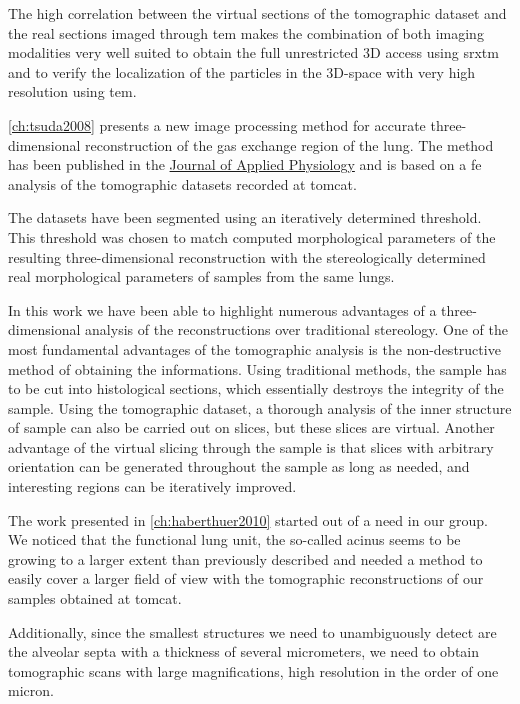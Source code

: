 The high correlation between the virtual sections of the tomographic dataset and the real sections imaged through \ac{tem} makes the combination of both imaging modalities very well suited to obtain the full unrestricted 3D access using \ac{srxtm} and to verify the localization of the particles in the 3D-space with very high resolution using \ac{tem}.

\autoref{ch:tsuda2008} presents a new image processing method for accurate three-dimensional reconstruction of the gas exchange region of the lung. The method has been published in the \href{http://jap.physiology.org/}{Journal of Applied Physiology} and is based on a \ac{fe} analysis of the tomographic datasets recorded at \ac{tomcat}. 

The datasets have been segmented using an iteratively determined threshold. This threshold was chosen to match computed morphological parameters of the resulting three-dimensional reconstruction with the stereologically determined real morphological parameters of samples from the same lungs.

In this work we have been able to highlight numerous advantages of a three-dimensional analysis of the reconstructions over traditional stereology. One of the most fundamental advantages of the tomographic analysis is the non-destructive method of obtaining the informations. Using traditional methods, the sample has to be cut into histological sections, which essentially destroys the integrity of the sample. Using the tomographic dataset, a thorough analysis of the inner structure of sample can also be carried out on slices, but these slices are virtual. Another advantage of the virtual slicing through the sample is that slices with arbitrary orientation can be generated throughout the sample as long as needed, and interesting regions can be iteratively improved.

The work presented in \autoref{ch:haberthuer2010} started out of a need in our group. We noticed that the functional lung unit, the so-called acinus seems to be growing to a larger extent than previously described \cite{Massaro1985,Massaro1992} and needed a method to easily cover a larger field of view with the tomographic reconstructions of our samples obtained at \ac{tomcat}. 

Additionally, since the smallest structures we need to unambiguously detect are the alveolar septa with a thickness of several micrometers, we need to obtain tomographic scans with large magnifications, \ie high resolution in the order of one micron. 


